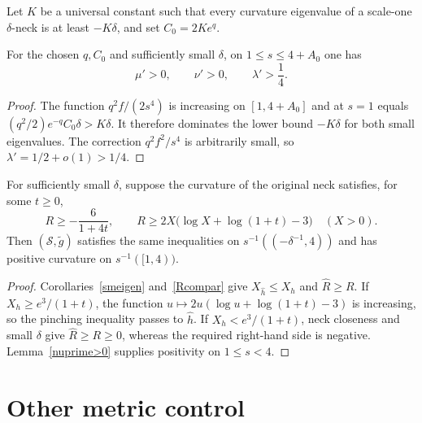 Let $K$ be a universal constant such that every curvature eigenvalue of a
scale-one $\delta$-neck is at least $-K\delta$, and set
$C_0=2Ke^q$.

\begin{lemma}
\label{lem:positive-eigenvalues-surgery-region}

\label{nuprime>0}
For the chosen $q,C_0$ and sufficiently small $\delta$, on
$1\leq s\leq4+A_0$ one has
\[
  \mu'>0,\qquad\nu'>0,\qquad\lambda'>\frac14.
\]
\end{lemma}

\begin{proof}
\sketch
The function $q^2f/(2s^4)$ is increasing on $[1,4+A_0]$ and at $s=1$ equals
$(q^2/2)e^{-q}C_0\delta>K\delta$. It therefore dominates the lower bound
$-K\delta$ for both small eigenvalues. The correction
$q^2f^2/s^4$ is arbitrarily small, so $\lambda'=1/2+o(1)>1/4$.
\end{proof}

\begin{proposition}
\label{prop:pinching-preserved-s-less-4}
For sufficiently small $\delta$, suppose the curvature of the original neck
satisfies, for some $t\geq0$,
\[
  R\geq-\frac6{1+4t},
  \qquad
  R\geq2X\bigl(\log X+\log(1+t)-3\bigr)
  \quad(X>0).
\]
Then $({\mathcal S},\widetilde g)$ satisfies the same inequalities on
$s^{-1}(( -\delta^{-1},4))$ and has positive curvature on
$s^{-1}([1,4))$.
\end{proposition}

\begin{proof}
\sketch
{}
Corollaries~\ref{smeigen} and~\ref{Rcompar} give
$X_{\widehat h}\leq X_h$ and $\widehat R\geq R$. If
$X_h\geq e^3/(1+t)$, the function
$u\mapsto2u(\log u+\log(1+t)-3)$ is increasing, so the pinching inequality
passes to $\widehat h$. If $X_h<e^3/(1+t)$, neck closeness and small $\delta$
give $\widehat R\geq R\geq0$, whereas the required right-hand side is
negative. Lemma~\ref{nuprime>0} supplies positivity on $1\leq s<4$.
\end{proof}

\section{Other metric control}

